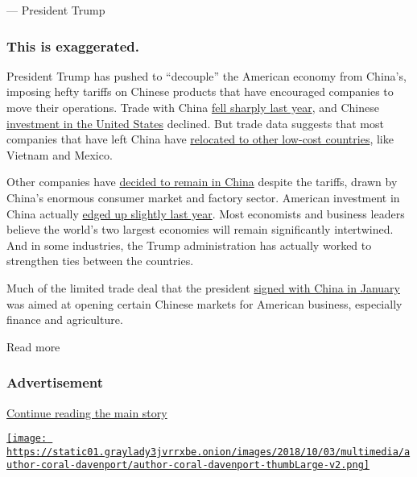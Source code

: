 --- President Trump

\hypertarget{this-is-exaggerated-}{%
\subsubsection{This is exaggerated. }\label{this-is-exaggerated-}}

President Trump has pushed to ``decouple'' the American economy from
China's, imposing hefty tariffs on Chinese products that have encouraged
companies to move their operations. Trade with China
\href{https://www.nytimes3xbfgragh.onion/2020/02/05/business/economy/trump-trade.html}{fell
sharply last year}, and Chinese
\href{https://rhg.com/research/two-way-street-us-china-investment-trends-2020-update/}{investment
in the United States} declined. But trade data suggests that most
companies that have left China have
\href{https://www.nytimes3xbfgragh.onion/2020/02/05/business/economy/trump-trade.html}{relocated
to other low-cost countries}, like Vietnam and Mexico.

Other companies have
\href{https://www.nytimes3xbfgragh.onion/2020/07/22/business/economy/coronavirus-globalization-jobs-supply-chain-china.html}{decided
to remain in China} despite the tariffs, drawn by China's enormous
consumer market and factory sector. American investment in China
actually
\href{https://rhg.com/research/two-way-street-us-china-investment-trends-2020-update/}{edged
up slightly last year}. Most economists and business leaders believe the
world's two largest economies will remain significantly intertwined. And
in some industries, the Trump administration has actually worked to
strengthen ties between the countries.

Much of the limited trade deal that the president
\href{https://www.nytimes3xbfgragh.onion/2020/01/15/business/economy/china-trade-deal.html}{signed
with China in January} was aimed at opening certain Chinese markets for
American business, especially finance and agriculture.

Read more

\hypertarget{advertisement}{%
\subsubsection{Advertisement}\label{advertisement}}

\protect\hyperlink{after-dfp-ad-mid1}{Continue reading the main story}

\href{https://www.nytimes3xbfgragh.onion/by/coral-davenport}{\texttt{[image: https://static01.graylady3jvrrxbe.onion/images/2018/10/03/multimedia/author-coral-davenport/author-coral-davenport-thumbLarge-v2.png]}}

